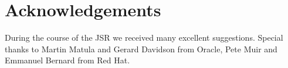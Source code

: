 \section{Acknowledgements}
\label{acks}

During the course of the JSR we received many excellent suggestions. Special thanks to Martin Matula and Gerard Davidson from Oracle, Pete Muir and Emmanuel Bernard from Red Hat.



